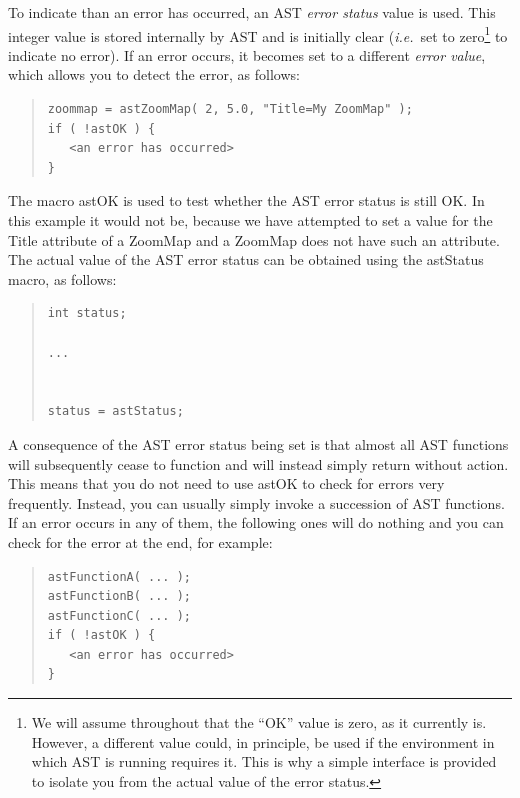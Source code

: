\documentclass[twoside,11pt]{article}
\newcommand{\htmlref}[2]{#1}
\begin{document}
To indicate than an error has occurred, an AST {\em{error status}}
value is used. This integer value is stored internally by AST and is
initially clear ({\em{i.e.}}\ set to zero\footnote{We will assume
throughout that the ``OK'' value is zero, as it currently is. However,
a different value could, in principle, be used if the environment in
which AST is running requires it. This is why a simple interface is
provided to isolate you from the actual value of the error status.}
to indicate no error). If an error occurs, it becomes set to a
different {\em{error value}}, which allows you to detect the error, as
follows:

\begin{quote}
\small
\begin{verbatim}
zoommap = astZoomMap( 2, 5.0, "Title=My ZoomMap" );
if ( !astOK ) {
   <an error has occurred>
}
\end{verbatim}
\normalsize
\end{quote}

The macro \htmlref{astOK}{astOK} is used to test whether the AST error status is still
OK. In this example it would not be, because we have attempted to set
a value for the \htmlref{Title}{Title} attribute of a \htmlref{ZoomMap}{ZoomMap} and a ZoomMap does not
have such an attribute.  The actual value of the AST error status can
be obtained using the \htmlref{astStatus}{astStatus} macro, as follows:

\begin{quote}
\small
\begin{verbatim}
int status;

...


status = astStatus;
\end{verbatim}
\normalsize
\end{quote}

A consequence of the AST error status being set is that almost all AST
functions will subsequently cease to function and will instead simply
return without action.  This means that you do not need to use astOK
to check for errors very frequently. Instead, you can usually simply
invoke a succession of AST functions. If an error occurs in any of
them, the following ones will do nothing and you can check for the
error at the end, for example:

\begin{quote}
\small
\begin{verbatim}
astFunctionA( ... );
astFunctionB( ... );
astFunctionC( ... );
if ( !astOK ) {
   <an error has occurred>
}
\end{verbatim}
\normalsize
\end{quote}
\end{document}
